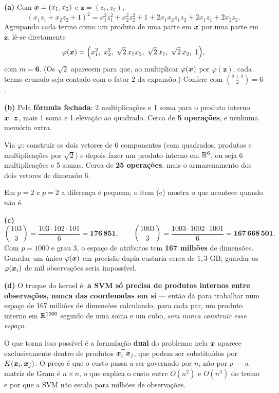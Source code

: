 \documentclass[11pt,a4paper]{article}
\begin{document}
\begin{solucao}
\textbf{(a)} Com $\bm{x}=(x_1,x_2)$ e $\bm z=(z_1,z_2)$,
\[
  (x_1z_1+x_2z_2+1)^2
  = x_1^2z_1^2 + x_2^2z_2^2 + 1 + 2x_1x_2z_1z_2 + 2x_1z_1 + 2x_2z_2 .
\]
Agrupando cada termo como um produto de uma parte em $\bm{x}$ por uma parte em
$\bm z$, lê-se diretamente
\[
  \varphi(\x) = \Big(x_1^2,\ x_2^2,\ \sqrt2\,x_1x_2,\ \sqrt2\,x_1,\ \sqrt2\,x_2,\ 1\Big),
\]
com $m=\mathbf{6}$. (Os $\sqrt2$ aparecem para que, ao multiplicar
$\varphi(\bm{x})$ por $\varphi(\bm z)$, cada termo cruzado seja contado com o fator
$2$ da expansão.) Confere com $\binom{2+2}{2}=6$.

\smallskip
\textbf{(b)} Pela \textbf{fórmula fechada}: 2 multiplicações e 1 soma para o
produto interno $\bm{x}^\top\bm z$, mais 1 soma e 1 elevação ao quadrado. Cerca de
\textbf{5 operações}, e nenhuma memória extra.

Via $\varphi$: construir os dois vetores de 6 componentes (com quadrados,
produtos e multiplicações por $\sqrt2$) e depois fazer um produto interno em
$\mathbb{R}^6$, ou seja 6 multiplicações e 5 somas. Cerca de \textbf{25 operações}, mais
o armazenamento dos dois vetores de dimensão 6.

Em $p=2$ e $p=2$ a diferença é pequena; o item (c) mostra o que acontece quando
não é.

\smallskip
\textbf{(c)}
\[
  \binom{103}{3} = \frac{103\cdot102\cdot101}{6} = \mathbf{176\,851},
  \qquad
  \binom{1003}{3} = \frac{1003\cdot1002\cdot1001}{6} = \mathbf{167\,668\,501}.
\]
Com $p=1000$ e grau 3, o espaço de atributos tem \textbf{167 milhões} de
dimensões. Guardar um único $\varphi(\bm{x})$ em precisão dupla custaria cerca de
$1{,}3$ GB; guardar os $\varphi(\bm{x}_i)$ de mil observações seria impossível.

\smallskip
\textbf{(d)} O truque do kernel é: \textbf{a SVM só precisa de produtos internos
entre observações, nunca das coordenadas em si} --- então dá para trabalhar num
espaço de 167 milhões de dimensões calculando, para cada par, um produto interno
em $\mathbb{R}^{1000}$ seguido de uma soma e um cubo, \emph{sem nunca construir esse
espaço}.

O que torna isso possível é a formulação \textbf{dual} do problema: nela $\bm{x}$
aparece exclusivamente dentro de produtos $\bm{x}_i^\top\bm{x}_j$, que podem ser
substituídos por $K(\bm{x}_i,\bm{x}_j)$. O preço é que o custo passa a ser governado por
$n$, não por $p$ --- a matriz de Gram é $n\times n$, o que explica o custo entre
$O(n^2)$ e $O(n^3)$ do treino e por que a SVM não escala para milhões de
observações.
\end{solucao}
\end{document}
